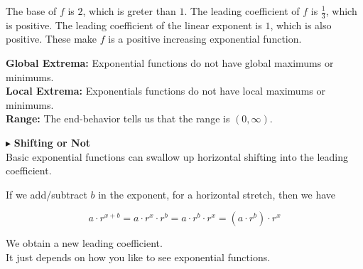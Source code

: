 \documentclass{ximera}
\begin{document}
\begin{example}
The base of $f$ is $2$, which is greter than $1$. The leading coefficient of $f$ is $\frac{1}{3}$, which is positive. The leading coefficient of the linear exponent is $1$, which is also positive.  These make $f$ is a positive increasing exponential function.



\textbf{Global Extrema:}  Exponential functions do not have global maximums or minimums. \\


\textbf{Local Extrema:}  Exponentials functions do not have local maximums or minimums. \\



\textbf{Range:} The end-behavior tells us that the range is $(0, \infty)$.





\end{example}

















$\blacktriangleright$ \textbf{\textcolor{blue!55!black}{Shifting or Not}} \\



Basic exponential functions can swallow up horizontal shifting into the leading coefficient.



If we add/subtract $b$ in the exponent, for a horizontal stretch, then we have

\[
a \cdot r^{x + b} = a \cdot r^x \cdot r^b = a \cdot r^b \cdot r^x = (a \cdot r^b) \cdot r^x
\]

We obtain a new leading coefficient. \\

It just depends on how you like to see exponential functions. \\
\end{document}
